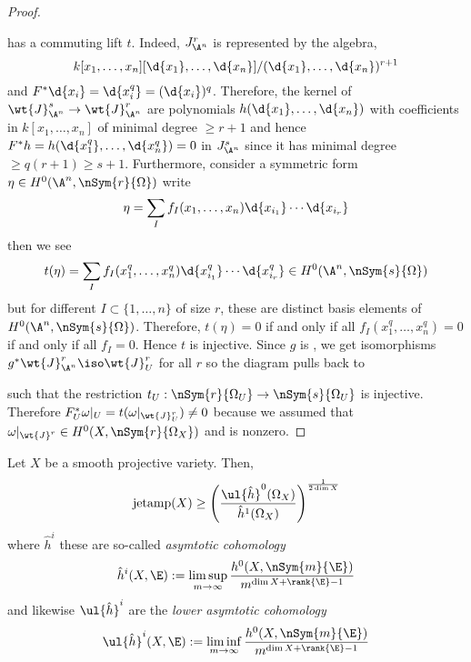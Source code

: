\documentclass[12pt]{article}
\begin{document}
\begin{proof}
\begin{center}
\end{center}
has a commuting lift $t$. Indeed, $J^r_{\A^n}$ is represented by the algebra,
\[ k[x_1, \dots, x_n][\d{x_1}, \dots, \d{x_n}] / (\d{x_1}, \dots, \d{x_n})^{r+1} \] and $F^* \d{x_i} = \d{x_i^{q}} = (\d{x_i})^{q}$. Therefore, the kernel of $\wt{J}^s_{\A^n} \to \wt{J}^r_{\A^n}$ are polynomials $h(\d{x_1}, \dots, \d{x_n})$ with coefficients in $k[x_1, \dots, x_n]$ of minimal degree $\ge r + 1$ and hence $F^* h = h(\d{x_1^{q}}, \dots, \d{x_n^{q}}) = 0$ in $J^s_{\A^n}$ since it has minimal degree $\ge q (r + 1) \ge s + 1$. Furthermore, consider a symmetric form $\eta \in H^0(\A^n, \nSym{r}{\Omega})$ write
\[ \eta = \sum_{I} f_I(x_1, \dots, x_n) \d{x_{i_1}} \cdots \d{x_{i_r}} \]
then we see
\[ t(\eta) = \sum_I f_I(x_1^q, \dots, x_n^q) \d{x_{i_1}^q} \cdots \d{x_{i_r}^q} \in H^0(\A^n, \nSym{s}{\Omega}) \]
but for different $I \subset \{1, \dots, n\}$ of size $r$, these are distinct basis elements of $H^0(\A^n, \nSym{s}{\Omega})$. Therefore, $t(\eta) = 0$ if and only if all $f_I(x_1^q, \dots, x_n^q) = 0$ if and only if all $f_I = 0$. Hence $t$ is injective. Since $g$ is \etale, we get isomorphisms $g^* \wt{J}_{\A^n}^r \iso \wt{J}^r_{U}$ for all $r$ so the diagram pulls back to
\begin{center}
\end{center}
such that the restriction $t_U : \nSym{r}{\Omega_U} \to \nSym{s}{\Omega_U}$ is injective. Therefore $F^*_U \omega|_U = t(\omega|_{\wt{J}^r_U}) \neq 0$ because we assumed that $\omega|_{\wt{J}^r} \in H^0(X, \nSym{r}{\Omega_X})$ and is nonzero.
\end{proof}

\begin{prop}
Let $X$ be a smooth projective variety. Then,
\[ \jetamp(X) \ge \left(\frac{\ul{\hat{h}}^0(\Omega_X)}{\hat{h}^1(\Omega_X)}\right)^{\frac{1}{2 \dim{X}}} \]
where $\hat{h}^i$ these are so-called \textit{asymtotic cohomology}
\[ \hat{h}^i(X, \E) := \limsup_{m \to \infty} \frac{h^0(X, \nSym{m}{\E})}{m^{\dim{X} + \rank{\E} - 1}} \]
and likewise $\ul{\hat{h}}^i$ are the \textit{lower asymtotic cohomology}
\[ \ul{\hat{h}}^i(X, \E) := \liminf_{m \to \infty} \frac{h^0(X, \nSym{m}{\E})}{m^{\dim{X} + \rank{\E} - 1}} \]
\end{prop}
\end{document}
